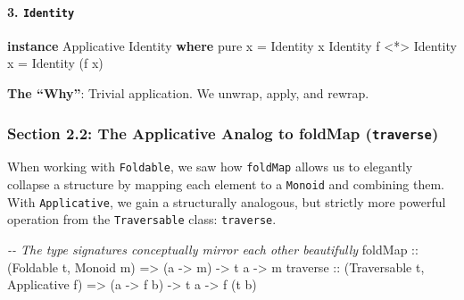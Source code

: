 \documentclass[
]{article}
\newenvironment{Shaded}{}{}
\newcommand{\CommentTok}[1]{\textcolor[rgb]{0.38,0.63,0.69}{\textit{#1}}}
\newcommand{\DataTypeTok}[1]{\textcolor[rgb]{0.56,0.13,0.00}{#1}}
\newcommand{\FunctionTok}[1]{\textcolor[rgb]{0.02,0.16,0.49}{#1}}
\newcommand{\KeywordTok}[1]{\textcolor[rgb]{0.00,0.44,0.13}{\textbf{#1}}}
\newcommand{\NormalTok}[1]{#1}
\newcommand{\OperatorTok}[1]{\textcolor[rgb]{0.40,0.40,0.40}{#1}}
\newcommand{\OtherTok}[1]{\textcolor[rgb]{0.00,0.44,0.13}{#1}}
\begin{document}
\paragraph{\texorpdfstring{3.
\texttt{Identity}}{3. Identity}}\label{identity}

\begin{Shaded}
\begin{Highlighting}[]
\KeywordTok{instance} \DataTypeTok{Applicative} \DataTypeTok{Identity} \KeywordTok{where}
    \FunctionTok{pure}\NormalTok{ x }\OtherTok{=} \DataTypeTok{Identity}\NormalTok{ x}
    \DataTypeTok{Identity}\NormalTok{ f }\OperatorTok{\textless{}*\textgreater{}} \DataTypeTok{Identity}\NormalTok{ x }\OtherTok{=} \DataTypeTok{Identity}\NormalTok{ (f x)}
\end{Highlighting}
\end{Shaded}

\textbf{The ``Why''}: Trivial application. We unwrap, apply, and rewrap.

\subsubsection{\texorpdfstring{Section 2.2: The Applicative Analog to
foldMap
(\texttt{traverse})}{Section 2.2: The Applicative Analog to foldMap (traverse)}}\label{section-2.2-the-applicative-analog-to-foldmap-traverse}

When working with \texttt{Foldable}, we saw how \texttt{foldMap} allows
us to elegantly collapse a structure by mapping each element to a
\texttt{Monoid} and combining them. With \texttt{Applicative}, we gain a
structurally analogous, but strictly more powerful operation from the
\texttt{Traversable} class: \texttt{traverse}.

\begin{Shaded}
\begin{Highlighting}[]
\CommentTok{{-}{-} The type signatures conceptually mirror each other beautifully}
\FunctionTok{foldMap}\OtherTok{  ::}\NormalTok{ (}\DataTypeTok{Foldable}\NormalTok{ t,    }\DataTypeTok{Monoid}\NormalTok{ m)      }\OtherTok{=\textgreater{}}\NormalTok{ (a }\OtherTok{{-}\textgreater{}}\NormalTok{ m)   }\OtherTok{{-}\textgreater{}}\NormalTok{ t a }\OtherTok{{-}\textgreater{}}\NormalTok{ m}
\FunctionTok{traverse}\OtherTok{ ::}\NormalTok{ (}\DataTypeTok{Traversable}\NormalTok{ t, }\DataTypeTok{Applicative}\NormalTok{ f) }\OtherTok{=\textgreater{}}\NormalTok{ (a }\OtherTok{{-}\textgreater{}}\NormalTok{ f b) }\OtherTok{{-}\textgreater{}}\NormalTok{ t a }\OtherTok{{-}\textgreater{}}\NormalTok{ f (t b)}
\end{Highlighting}
\end{Shaded}
\end{document}
